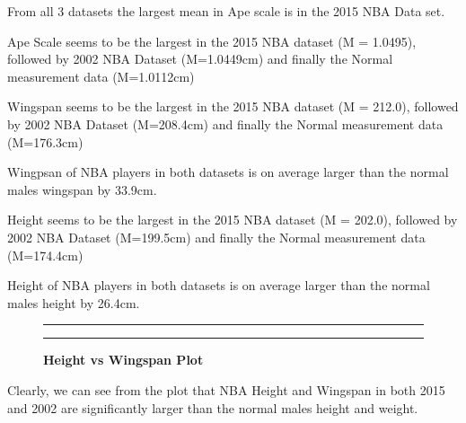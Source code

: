 \documentclass[]{article}
\begin{document}
\vspace{2.5mm}

\noindent From all 3 datasets the largest mean in Ape scale is in the
2015 NBA Data set.

\noindent Ape Scale seems to be the largest in the 2015 NBA dataset (M =
1.0495), followed by 2002 NBA Dataset (M=1.0449cm) and finally the
Normal measurement data (M=1.0112cm) \vspace{2.5mm}

\noindent Wingspan seems to be the largest in the 2015 NBA dataset (M =
212.0), followed by 2002 NBA Dataset (M=208.4cm) and finally the Normal
measurement data (M=176.3cm)

\noindent Wingpsan of NBA players in both datasets is on average larger
than the normal males wingspan by 33.9cm. \vspace{1mm}

\noindent Height seems to be the largest in the 2015 NBA dataset (M =
202.0), followed by 2002 NBA Dataset (M=199.5cm) and finally the Normal
measurement data (M=174.4cm)

\noindent Height of NBA players in both datasets is on average larger
than the normal males height by 26.4cm.

\newpage

\begin{figure}[!ht]
    \hrule
    \caption{ \textbf{Height vs Wingspan Plot} }
    \begin{center}
    \end{center}
    \label{sec:Summary of Sample}
    \hrule
\end{figure}

\vspace{2.5mm}

\noindent Clearly, we can see from the plot that NBA Height and Wingspan
in both 2015 and 2002 are significantly larger than the normal males
height and weight. \vspace{2.5mm}
\end{document}
